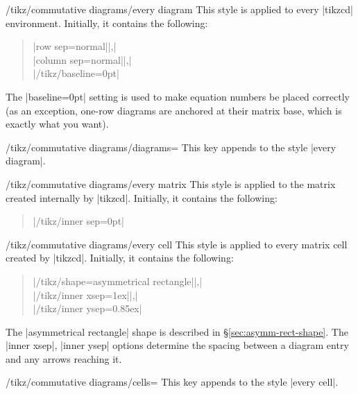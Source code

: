 \documentclass[a4paper]{ltxdoc}
\begin{document}
\begin{stylekey}{/tikz/commutative diagrams/every diagram}
  This style is applied to every |{tikzcd}| environment.  Initially, it
  contains the following:
\begin{quote}
|row sep=normal||,|\\
|column sep=normal||,|\\
|/tikz/baseline=0pt|
\end{quote}
\end{stylekey}

The |baseline=0pt| setting is used to make equation numbers be placed
correctly (as an exception, one-row diagrams are anchored at their
matrix base, which is exactly what you want).

\begin{key}{/tikz/commutative diagrams/diagrams=}
  This key appends  to the style |every diagram|.
\end{key}

\begin{stylekey}{/tikz/commutative diagrams/every matrix}
  This style is applied to the \tikzname{} matrix created internally
  by |{tikzcd}|.  Initially, it contains the following:
\begin{quote}
|/tikz/inner sep=0pt|
\end{quote}
\end{stylekey}

\begin{stylekey}{/tikz/commutative diagrams/every cell}
  This style is applied to every \tikzname{} matrix cell created by
  |{tikzcd}|.  Initially, it contains the following:
\begin{quote}
|/tikz/shape=asymmetrical rectangle||,|\\
|/tikz/inner xsep=1ex||,|\\
|/tikz/inner ysep=0.85ex|
\end{quote}
\end{stylekey}

The |asymmetrical rectangle| shape is described in
\S\ref{sec:asymm-rect-shape}.  The |inner xsep|, |inner ysep| options
determine the spacing between a diagram entry and any arrows reaching
it.

\begin{key}{/tikz/commutative diagrams/cells=}
  This key appends  to the style |every cell|.
\end{key}

\def\printsepaux+#1em{#1\,em}
\def\printsep#1#2{\edef\temp{\pgfkeysvalueof{/tikz/commutative diagrams/#1 sep/#2}}\expandafter\printsepaux\temp}
\end{document}
